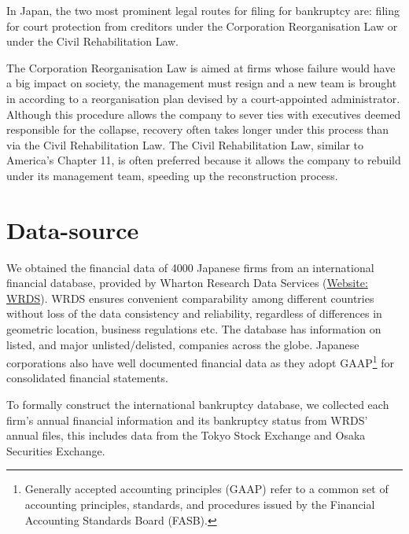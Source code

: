 In Japan, the two most prominent legal routes for filing for bankruptcy are: filing for court protection from creditors under the Corporation Reorganisation Law or under the Civil Rehabilitation Law.

The Corporation Reorganisation Law is aimed at firms whose failure would have a big impact on society, the management must resign and a new team is brought in according to a reorganisation plan devised by a court-appointed administrator. Although this procedure allows the company to sever ties with executives deemed responsible for the collapse, recovery often takes longer under this process than via the Civil Rehabilitation Law.
The Civil Rehabilitation Law, similar to America's Chapter 11, is often preferred because it allows the company to rebuild under its management team, speeding up the reconstruction process.

\section{Data-source}
\label{sec:dataSource}
We obtained the financial data of 4000 Japanese firms from an international financial database, provided by Wharton Research Data Services (\href{https://osiris.bvdinfo.com/version-20191113/home.serv?product=OsirisNeo}{Website: WRDS}). WRDS ensures convenient comparability among different countries without loss of the data consistency and reliability, regardless of differences in geometric location, business regulations etc. The database has information on listed, and major unlisted/delisted, companies across the globe. Japanese corporations also have well documented financial data as they adopt GAAP\footnote{Generally accepted accounting principles (GAAP) refer to a common set of accounting principles, standards, and procedures issued by the Financial Accounting Standards Board (FASB).} for consolidated financial statements.

To formally construct the international bankruptcy database, we collected each firm's annual financial information and its bankruptcy status from WRDS' annual files, this includes data from the Tokyo Stock Exchange and Osaka Securities Exchange.


